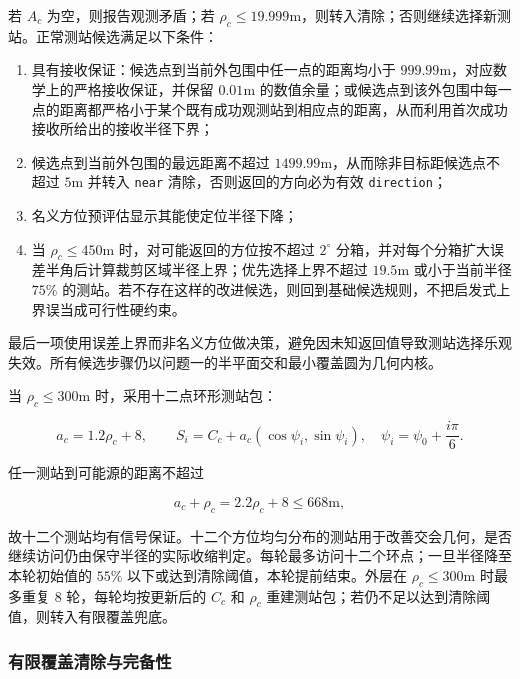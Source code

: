 若 $A_c$ 为空，则报告观测矛盾；若 $\rho_c\le19.999\mathrm{m}$，则转入清除；否则继续选择新测站。正常测站候选满足以下条件：

\begin{enumerate}
\item 具有接收保证：候选点到当前外包围中任一点的距离均小于 $999.99\mathrm{m}$，对应数学上的严格接收保证，并保留 $0.01\mathrm{m}$ 的数值余量；或候选点到该外包围中每一点的距离都严格小于某个既有成功观测站到相应点的距离，从而利用首次成功接收所给出的接收半径下界；
\item 候选点到当前外包围的最远距离不超过 $1499.99\mathrm{m}$，从而除非目标距候选点不超过 $5\mathrm{m}$ 并转入 \texttt{near} 清除，否则返回的方向必为有效 \texttt{direction}；
\item 名义方位预评估显示其能使定位半径下降；
\item 当 $\rho_c\le450\mathrm{m}$ 时，对可能返回的方位按不超过 $2^\circ$ 分箱，并对每个分箱扩大误差半角后计算裁剪区域半径上界；优先选择上界不超过 $19.5\mathrm{m}$ 或小于当前半径 $75\%$ 的测站。若不存在这样的改进候选，则回到基础候选规则，不把启发式上界误当成可行性硬约束。
\end{enumerate}

最后一项使用误差上界而非名义方位做决策，避免因未知返回值导致测站选择乐观失效。所有候选步骤仍以问题一的半平面交和最小覆盖圆为几何内核。

当 $\rho_c\le300\mathrm{m}$ 时，采用十二点环形测站包：

\begin{equation}
a_c=1.2\rho_c+8,
\qquad
S_i=C_c+a_c\left(\cos\psi_i,\sin\psi_i\right),
\quad
\psi_i=\psi_0+\frac{i\pi}{6}.
\label{eq:q3_packet_sites}
\end{equation}

任一测站到可能源的距离不超过

\begin{equation}
a_c+\rho_c=2.2\rho_c+8\le668\mathrm{m},
\label{eq:q3_packet_receive}
\end{equation}

故十二个测站均有信号保证。十二个方位均匀分布的测站用于改善交会几何，是否继续访问仍由保守半径的实际收缩判定。每轮最多访问十二个环点；一旦半径降至本轮初始值的 $55\%$ 以下或达到清除阈值，本轮提前结束。外层在 $\rho_c\le300\mathrm{m}$ 时最多重复 8 轮，每轮均按更新后的 $C_c$ 和 $\rho_c$ 重建测站包；若仍不足以达到清除阈值，则转入有限覆盖兜底。

\subsubsection{有限覆盖清除与完备性}

